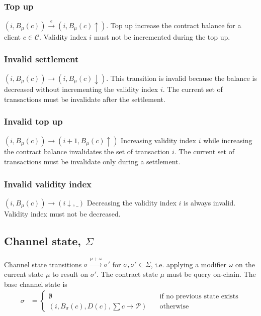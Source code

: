 \documentclass{llncs}
\begin{document}
\subsubsection{Top up} $(i, B_\mu(c)) \xrightarrow{e} (i, B_\mu(c)\uparrow)$. Top up increase the contract balance for a client $c \in \mathcal{C}$. Validity index $i$ must not be incremented during the top up.

\subsubsection{Invalid settlement} $(i, B_\mu(c)) \rightarrow (i, B_\mu(c)\downarrow)$. This transition is invalid because the balance is decreased without incrementing the validity index $i$. The current set of transactions must be invalidate after the settlement.

\subsubsection{Invalid top up} $(i, B_\mu(c)) \rightarrow (i+1, B_\mu(c)\uparrow)$ Increasing validity index $i$ while increasing the contract balance invalidates the set of transaction $i$. The current set of transactions must be invalidate only during a settlement.

\subsubsection{Invalid validity index} $(i, B_\mu(c)) \rightarrow (i\downarrow, \_)$ Decreasing the validity index $i$ is always invalid. Validity index must not be decreased.

\subsection{Channel state, $\Sigma$} Channel state transitions $\sigma \xrightarrow{\mu + \omega} \sigma'$ for $\sigma, \sigma' \in \Sigma$, i.e. applying a modifier $\omega$ on the current state $\mu$ to result on $\sigma'$. The contract state $\mu$ must be query on-chain. The base channel state is
\begin{equation*}
\begin{split}
  \sigma &=
  \begin{cases}
    \emptyset & \quad \text{if no previous state exists} \\
    (i, B_\sigma(c), D(c), \textstyle \sum c \rightarrow \mathcal{P}) & \quad \text{otherwise}
  \end{cases}
\end{split}
\end{equation*}
\end{document}
